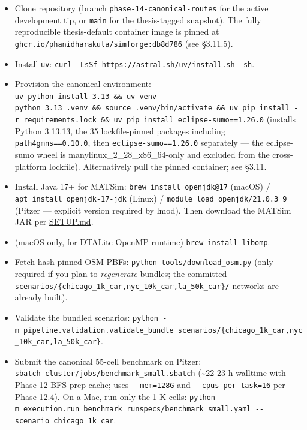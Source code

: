 \begin{itemize}
\tightlist
\item[$\square$]
  Clone repository (branch \texttt{phase-14-canonical-routes} for the
  active development tip, or \texttt{main} for the thesis-tagged
  snapshot). The fully reproducible thesis-default container image is
  pinned at \texttt{ghcr.io/phanidharakula/simforge:db8d786} (see
  §3.11.5).
\item[$\square$]
  Install \texttt{uv}:
  \texttt{curl\ -LsSf\ https://astral.sh/uv/install.sh\ \textbar{}\ sh}.
\item[$\square$]
  Provision the canonical environment:
  \texttt{uv\ python\ install\ 3.13\ \&\&\ uv\ venv\ -\/-python\ 3.13\ .venv\ \&\&\ source\ .venv/bin/activate\ \&\&\ uv\ pip\ install\ -r\ requirements.lock\ \&\&\ uv\ pip\ install\ eclipse-sumo==1.26.0}
  (installs Python 3.13.13, the 35 lockfile-pinned packages including
  \texttt{path4gmns==0.10.0}, then \texttt{eclipse-sumo==1.26.0}
  separately --- the eclipse-sumo wheel is
  manylinux\_2\_28\_x86\_64-only and excluded from the cross-platform
  lockfile). Alternatively pull the pinned container; see §3.11.
\item[$\square$]
  Install Java 17+ for MATSim: \texttt{brew\ install\ openjdk@17}
  (macOS) / \texttt{apt\ install\ openjdk-17-jdk} (Linux) /
  \texttt{module\ load\ openjdk/21.0.3\_9} (Pitzer --- explicit version
  required by lmod). Then download the MATSim JAR per
  \href{../../SETUP.md}{SETUP.md}.
\item[$\square$]
  (macOS only, for DTALite OpenMP runtime)
  \texttt{brew\ install\ libomp}.
\item[$\square$]
  Fetch hash-pinned OSM PBFs: \texttt{python\ tools/download\_osm.py}
  (only required if you plan to \emph{regenerate} bundles; the committed
  \texttt{scenarios/\{chicago\_1k\_car,nyc\_10k\_car,la\_50k\_car\}/}
  networks are already built).
\item[$\square$]
  Validate the bundled scenarios:
  \texttt{python\ -m\ pipeline.validation.validate\_bundle\ scenarios/\{chicago\_1k\_car,nyc\_10k\_car,la\_50k\_car\}}.
\item[$\square$]
  Submit the canonical 55-cell benchmark on Pitzer:
  \texttt{sbatch\ cluster/jobs/benchmark\_small.sbatch}
  (\textasciitilde22-23 h walltime with Phase 12 BFS-prep cache; uses
  \texttt{-\/-mem=128G} and \texttt{-\/-cpus-per-task=16} per Phase
  12.4). On a Mac, run only the 1 K cells:
  \texttt{python\ -m\ execution.run\_benchmark\ runspecs/benchmark\_small.yaml\ -\/-scenario\ chicago\_1k\_car}.

\end{itemize}
